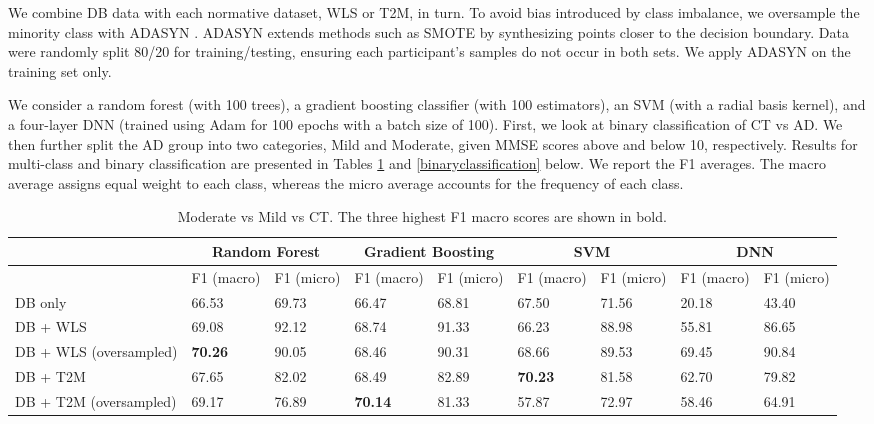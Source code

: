 \documentclass{article}
\begin{document}
We combine DB data with each normative dataset, WLS or T2M, in turn.  To avoid bias introduced by class imbalance, we oversample the minority class with ADASYN \cite{He2008}. ADASYN extends methods such as SMOTE by synthesizing points closer to the decision boundary. Data were randomly split 80/20 for training/testing, ensuring each participant's samples do not occur in both sets. We apply ADASYN on the training set only.

We consider a random forest (with 100 trees), a gradient boosting classifier (with 100 estimators), an SVM (with a radial basis kernel), and a four-layer DNN (trained using Adam for 100 epochs with a batch size of 100). First, we look at binary classification of CT vs AD. We then further split the AD group into two categories, Mild and Moderate, given MMSE scores above and below 10, respectively. Results for multi-class and binary classification are presented in Tables \ref{multiclassification} and \ref{binaryclassification} below. We report the F1 averages. The macro average assigns equal weight to each class, whereas the micro average accounts for the frequency of each class.

\begin{table}[h]
\caption{Moderate vs Mild vs CT. The three highest F1 macro scores are shown in bold.}
\centering
\begin{tabular}{|p{2cm}||p{1cm}p{1cm}|p{1cm}p{1cm}|p{1cm}p{1cm}|p{1cm}p{1cm}|}
\hline
                         & \multicolumn{2}{c|}{Random Forest} & \multicolumn{2}{c|}{Gradient Boosting} & \multicolumn{2}{c|}{SVM} & \multicolumn{2}{c|}{DNN} \\ \hline
                         & F1 \newline (macro)       & F1 \newline (micro)      & F1 \newline (macro)         & F1 \newline (micro)        & F1 \newline (macro)  & F1 \newline (micro) & F1 \newline (macro)  & F1 \newline (micro) \\ \hline
DB only                  & 			     66.53   & 69.73 & 66.47 & 68.81 & 67.50  & 71.56 & 20.18 & 43.40 \\ \hline
DB + WLS                & 			     69.08   & 92.12 & 68.74 & 91.33 & 66.23  & 88.98 & 55.81 &  86.65 \\ \hline
DB + WLS \newline (oversampled)    &   \textbf{70.26} & 90.05 & 68.46 & 90.31 & 68.66 & 89.53 & 69.45 & 90.84\\ \hline
DB + T2M             & 			      67.65  & 82.02 & 68.49 & 82.89 & \textbf{70.23}  & 81.58 & 62.70 &  79.82 \\ \hline
DB + T2M \newline (oversampled) & 69.17  & 76.89 & \textbf{70.14} &  81.33 & 57.87 & 72.97 & 58.46 & 64.91\\ \hline
\end{tabular}
\label{multiclassification}
\end{table}
\end{document}
